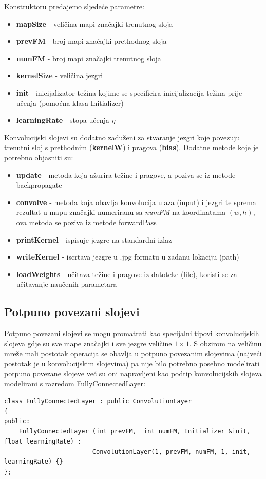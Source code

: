 \documentclass[times, utf8, zavrsni, numeric]{fer}
\begin{document}
Konstruktoru predajemo sljedeće parametre:
\begin{itemize}
\item \textbf{mapSize} - veličina mapi značajki trenutnog sloja
\item \textbf{prevFM} - broj mapi značajki prethodnog sloja
\item \textbf{numFM} - broj mapi značajki trenutnog sloja
\item \textbf{kernelSize} - veličina jezgri
\item \textbf{init} - inicijalizator težina kojime se specificira inicijalizacija težina prije učenja (pomoćna klasa Initializer)
\item \textbf{learningRate} - stopa učenja $\eta$
\end{itemize}

Konvolucijski slojevi su dodatno zaduženi za stvaranje jezgri koje povezuju trenutni sloj s prethodnim (\textbf{kernelW}) i pragova (\textbf{bias}). Dodatne metode koje je potrebno objasniti su:
\begin{itemize}
\item \textbf{update} - metoda koja ažurira težine i pragove, a poziva se iz metode backpropagate
\item \textbf{convolve} - metoda koja obavlja konvolucija ulaza (input) i jezgri te sprema rezultat u mapu značajki numeriranu sa \textit{numFM} na koordinatama $(w, h)$, ova metoda se poziva iz metode forwardPass
\item \textbf{printKernel} - ispisuje jezgre na standardni izlaz
\item \textbf{writeKernel} - iscrtava jezgre u .jpg formatu u zadanu lokaciju (path)
\item \textbf{loadWeights} - učitava težine i pragove iz datoteke (file), koristi se za učitavanje naučenih parametara
\end{itemize}

\subsection{Potpuno povezani slojevi}
Potpuno povezani slojevi se mogu promatrati kao specijalni tipovi konvolucijskih slojeva gdje su sve mape značajki i sve jezgre veličine $1 \times 1$. S obzirom na veličinu mreže mali postotak operacija se obavlja u potpuno povezanim slojevima (najveći postotak je u konvolucijskim slojevima) pa nije bilo potrebno posebno modelirati potpuno povezane slojeve već su oni napravljeni kao podtip konvolucijskih slojeva modelirani s razredom FullyConnectedLayer:
\begin{lstlisting}[caption=Razred FullyConnectedLayer,
  label=FullLayer]
class FullyConnectedLayer : public ConvolutionLayer
{
public:
    FullyConnectedLayer (int prevFM,  int numFM, Initializer &init, float learningRate) :
                        ConvolutionLayer(1, prevFM, numFM, 1, init, learningRate) {}
};
\end{lstlisting}
\end{document}
